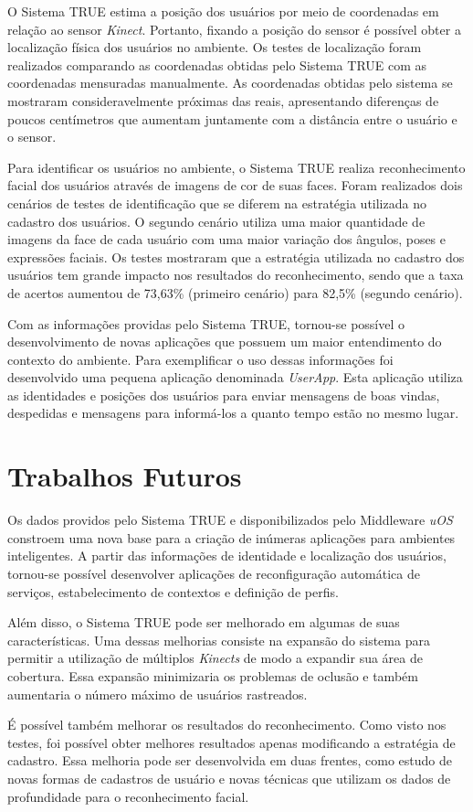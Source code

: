 O Sistema TRUE estima a posição dos usuários por meio de coordenadas em relação ao sensor \textit{Kinect}. Portanto, fixando a posição do sensor é possível obter a localização física dos usuários no ambiente. Os testes de localização foram realizados comparando as coordenadas obtidas pelo Sistema TRUE com as coordenadas mensuradas manualmente. As coordenadas obtidas pelo sistema se mostraram consideravelmente próximas das reais, apresentando diferenças de poucos centímetros que aumentam juntamente com a distância entre o usuário e o sensor. 

Para identificar os usuários no ambiente, o Sistema TRUE realiza reconhecimento facial dos usuários através de imagens de cor de suas faces. Foram realizados dois cenários de testes de identificação que se diferem na estratégia utilizada no cadastro dos usuários. O segundo cenário utiliza uma maior quantidade de imagens da face de cada usuário com uma maior variação dos ângulos, poses e expressões faciais. Os testes mostraram que a estratégia utilizada no cadastro dos usuários tem grande impacto nos resultados do reconhecimento, sendo que a taxa de acertos aumentou de 73,63\% (primeiro cenário) para 82,5\% (segundo cenário).

Com as informações providas pelo Sistema TRUE, tornou-se possível o desenvolvimento de novas aplicações que possuem um maior entendimento do contexto do ambiente. Para exemplificar o uso dessas informações foi desenvolvido uma pequena aplicação denominada \textit{UserApp}. Esta aplicação utiliza as identidades e posições dos usuários para enviar mensagens de boas vindas, despedidas e mensagens para informá-los a quanto tempo estão no mesmo lugar.

\section{Trabalhos Futuros}

Os dados providos pelo Sistema TRUE e disponibilizados pelo Middleware \textit{uOS} constroem uma nova base para a criação de inúmeras aplicações para ambientes inteligentes. A partir das informações de identidade e localização dos usuários, tornou-se possível desenvolver aplicações de reconfiguração automática de serviços, estabelecimento de contextos e definição de perfis.

Além disso, o Sistema TRUE pode ser melhorado em algumas de suas características. Uma dessas melhorias consiste na expansão do sistema para permitir a utilização de múltiplos \textit{Kinects} de modo a expandir sua área de cobertura. Essa expansão minimizaria os problemas de oclusão e também aumentaria o número máximo de usuários rastreados.


É possível também melhorar os resultados do reconhecimento. Como visto nos testes, foi possível obter melhores resultados apenas modificando a estratégia de cadastro. Essa melhoria pode ser desenvolvida em duas frentes, como estudo de novas formas de cadastros de usuário e novas técnicas que utilizam os dados de profundidade para o reconhecimento facial.





